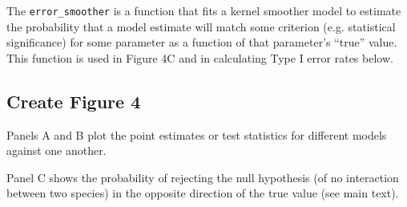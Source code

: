 \documentclass[11pt,]{article}
\newenvironment{Shaded}{\begin{snugshade}}{\end{snugshade}}
\newcommand{\KeywordTok}[1]{\textcolor[rgb]{0.13,0.29,0.53}{\textbf{{#1}}}}
\newcommand{\DataTypeTok}[1]{\textcolor[rgb]{0.13,0.29,0.53}{{#1}}}
\newcommand{\DecValTok}[1]{\textcolor[rgb]{0.00,0.00,0.81}{{#1}}}
\newcommand{\FloatTok}[1]{\textcolor[rgb]{0.00,0.00,0.81}{{#1}}}
\newcommand{\StringTok}[1]{\textcolor[rgb]{0.31,0.60,0.02}{{#1}}}
\newcommand{\NormalTok}[1]{{#1}}
\begin{document}
The \texttt{error\_smoother} is a function that fits a kernel smoother
model to estimate the probability that a model estimate will match some
criterion (e.g. statistical significance) for some parameter as a
function of that parameter's ``true'' value. This function is used in
Figure 4C and in calculating Type I error rates below.

\begin{Shaded}
\end{Shaded}

\subsection{Create Figure 4}\label{create-figure-4}

Panels A and B plot the point estimates or test statistics for different
models against one another.

Panel C shows the probability of rejecting the null hypothesis (of no
interaction between two species) in the opposite direction of the true
value (see main text).
\end{document}
